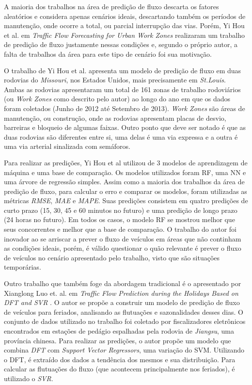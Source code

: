 A maioria dos trabalhos na área de predição de fluxo descarta os fatores aleatórios e considera apenas cenários ideais, descartando também os períodos de manutenção, onde ocorre a total, ou parcial interrupção das vias. Porém, Yi Hou et al. em \textit{Traffic Flow Forecasting for Urban Work Zones} \cite{hou2014traffic} realizaram um trabalho de predição de fluxo justamente nessas condições e, segundo o próprio autor, a falta de trabalhos da área para este tipo de cenário foi sua motivação. 

O trabalho de Yi Hou et al. apresenta um modelo de predição de fluxo em duas rodovias do \textit{Missouri}, nos Estados Unidos, mais precisamente em \textit{St.Louis}. Ambas as rodovias apresentaram um total de 161 zonas de trabalho rodoviários (ou \textit{Work Zones} como descrito pelo autor) ao longo do ano em que os dados foram coletados (Junho de 2012 até Setembro de 2013). \textit{Work Zones} são áreas de manutenção, ou construção, onde as rodovias apresentam placas de desvio, barreiras e bloqueio de algumas faixas. Outro ponto que deve ser notado é que as duas rodovias são diferentes entre si, uma delas é uma via expressa e a outra é uma via arterial sinalizada com semáforos.

Para realizar as predições, Yi Hou et al utilizou de 3 modelos de aprendizagem de máquina e uma base de comparação. Os modelos utilizados foram \acrfull{RF}, uma \acrfull{NN} e uma árvore de regressão simples. Assim como a maioria dos trabalhos da área de predição de fluxo, para calcular o erro e comparar os modelos, foram utilizadas as métricas \textit{RMSE}, \textit{MAE} e \textit{MAPE}. Suas predições consistem em quatro predições de curto prazo (15, 30, 45 e 60 minutos no futuro) e uma predição de longo prazo (24 horas no futuro). Em todos os casos, o modelo \acrshort{RF} se mostrou melhor que seus concorrentes e melhor que a base de comparação. O trabalho do autor foi inovador ao se arriscar a prever o fluxo de veículos em áreas que não continham as condições ideais, porém, é válido questionar o quão relevante é prever o fluxo de veículos no cenário apresentado pelo trabalho, visto que são situações temporárias.


Outro trabalho que também foge da abordagem tradicional é o apresentado por Xianglong Luo et. al. em \textit{Traffic Flow Prediction during the Holidays Based on DFT and SVR} \cite{luo2019traffic}. O autor se propõe a construir um modelo de predição de fluxo de veículos para feriados, analisando as flutuações e sazonalidades desses dias. O conjunto de dados utilizado no trabalho foi coletado por fiscalizadores eletrônicos encontrados em estações de pedágio espalhadas pela rodovia de \textit{Jiangsu}, uma província chinesa. Para realizar as predições, o autor propõe um modelo que combina \textit{\acrfull{DFT}} com \textit{Support Vector Regressors}, uma variação do \acrshort{SVM}. Utilizando o \acrshort{DFT}, é extraído dos dados a tendência dos mesmos e sua distribuição. Para calcular as flutuações do fluxo (que acontecem principalmente nos feriados), é utilizado o \textit{SVR}.

